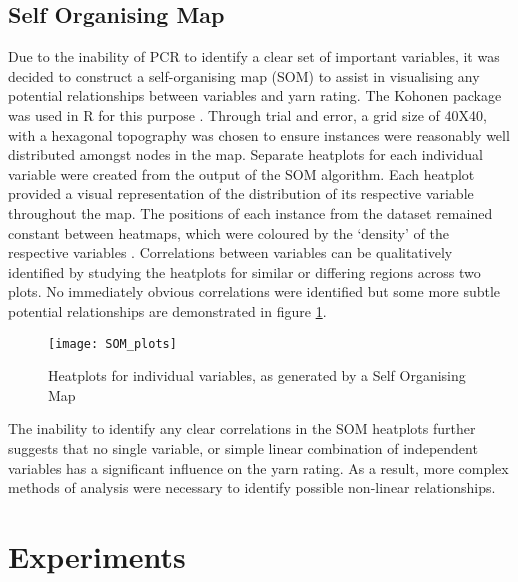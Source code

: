 \documentclass[journal]{IEEEtran}
\begin{document}
\subsection{Self Organising Map}
Due to the inability of PCR to identify a clear set of important variables, it was decided to construct a self-organising map (SOM) to assist in visualising any potential relationships between variables and yarn rating. The Kohonen package was used in R for this purpose \cite{WK2017}. Through trial and error, a grid size of 40X40, with a hexagonal topography was chosen to ensure instances were reasonably well distributed amongst nodes in the map. Separate heatplots for each individual variable were created from the output of the SOM algorithm. Each heatplot provided a visual representation of the distribution of its respective variable throughout the map. The positions of each instance from the dataset remained constant between heatmaps, which were coloured by the ‘density’ of the respective variables \cite{WK2017}. Correlations between variables can be qualitatively identified by studying the heatplots for similar or differing regions across two plots. No immediately obvious correlations were identified but some more subtle potential relationships are demonstrated in figure \ref{fig:SOM}.

\begin{figure}[h]
\caption{Heatplots for individual variables, as generated by a Self Organising Map}
\centering
\texttt{[image: SOM\_plots]}
\label{fig:SOM}
\end{figure}

\vspace{5mm}

The inability to identify any clear correlations in the SOM heatplots further suggests that no single variable, or simple linear combination of independent variables has a significant influence on the yarn rating. As a result, more complex methods of analysis were necessary to identify possible non-linear relationships.

\section{Experiments}
\end{document}
